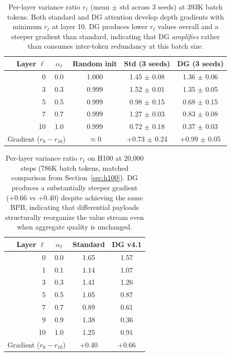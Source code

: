 \documentclass[11pt]{article}
\begin{document}
\begin{table}[H]
\centering
\caption{Per-layer variance ratio $r_\ell$ (mean $\pm$ std across 3 seeds) at 393K batch tokens. Both standard and DG attention develop depth gradients with minimum $r_\ell$ at layer 10. DG produces lower $r_\ell$ values overall and a steeper gradient than standard, indicating that DG \emph{amplifies} rather than consumes inter-token redundancy at this batch size.}
\label{tab:varratio}
\vspace{0.5em}
\begin{tabular}{@{}rcccc@{}}
\toprule
Layer $\ell$ & $\alpha_\ell$ & Random init & Std (3 seeds) & DG (3 seeds) \\
\midrule
0  & 0.0 & 1.000 & 1.45 $\pm$ 0.08 & 1.36 $\pm$ 0.06 \\
3  & 0.3 & 0.999 & 1.52 $\pm$ 0.01 & 1.35 $\pm$ 0.05 \\
5  & 0.5 & 0.999 & 0.98 $\pm$ 0.15 & 0.68 $\pm$ 0.15 \\
7  & 0.7 & 0.999 & 1.27 $\pm$ 0.03 & 0.83 $\pm$ 0.08 \\
10 & 1.0 & 0.999 & 0.72 $\pm$ 0.18 & 0.37 $\pm$ 0.03 \\
\midrule
\multicolumn{2}{c}{Gradient ($r_0 - r_{10}$)} & $\approx 0$ & +0.73 $\pm$ 0.24 & +0.99 $\pm$ 0.05 \\
\bottomrule
\end{tabular}
\end{table}

\begin{table}[H]
\centering
\caption{Per-layer variance ratio $r_\ell$ on H100 at 20{,}000 steps (786K batch tokens, matched comparison from Section~\ref{sec:h100}). DG produces a substantially steeper gradient (+0.66 vs +0.40) despite achieving the same BPB, indicating that differential payloads structurally reorganize the value stream even when aggregate quality is unchanged.}
\label{tab:varratio_h100}
\vspace{0.5em}
\begin{tabular}{@{}rccc@{}}
\toprule
Layer $\ell$ & $\alpha_\ell$ & Standard & DG v4.1 \\
\midrule
0  & 0.0 & 1.65 & 1.57 \\
1  & 0.1 & 1.14 & 1.07 \\
3  & 0.3 & 1.41 & 1.26 \\
5  & 0.5 & 1.05 & 0.87 \\
7  & 0.7 & 0.89 & 0.61 \\
9  & 0.9 & 1.38 & 0.36 \\
10 & 1.0 & 1.25 & 0.91 \\
\midrule
\multicolumn{2}{c}{Gradient ($r_0 - r_{10}$)} & +0.40 & +0.66 \\
\bottomrule
\end{tabular}
\end{table}
\end{document}
